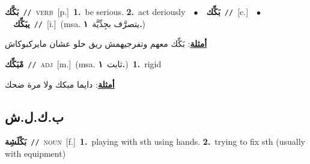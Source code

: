 \documentclass[10pt,a4paper,twoside]{article} %
\begin{document}
\begin{multicols}{2}
{\setlength\topsep{0pt}\textbf{\foreignlanguage{arabic}{بَكَّك}}\ {\color{gray}\texttt{//}\color{black}}\ \textsc{verb}\ [p.]\ \textbf{1.}~be serious.  \textbf{2.}~act deriously\ \ $\bullet$\ \ \setlength\topsep{0pt}\textbf{\foreignlanguage{arabic}{بَكِّك}}\ {\color{gray}\texttt{//}\color{black}}\ [c.]\ \ $\bullet$\ \ \setlength\topsep{0pt}\textbf{\foreignlanguage{arabic}{يبَكِّك}}\ {\color{gray}\texttt{//}\color{black}}\ [i.]\ \color{gray}(msa. \foreignlanguage{arabic}{يتصرَّف بجِدِّيَّة}~\foreignlanguage{arabic}{\textbf{١.}})\color{black}\  \begin{flushright}\color{gray}\foreignlanguage{arabic}{\textbf{\underline{\foreignlanguage{arabic}{أمثلة}}}: بَكِّك معهم وتفرجيهمش ريق حلو عشان مايركبوكاش}\end{flushright}\color{black}} \vspace{2mm}

{\setlength\topsep{0pt}\textbf{\foreignlanguage{arabic}{مْبَكِّك}}\ {\color{gray}\texttt{//}\color{black}}\ \textsc{adj}\ [m.]\ \color{gray}(msa. \foreignlanguage{arabic}{ثابت}~\foreignlanguage{arabic}{\textbf{١.}})\color{black}\ \textbf{1.}~rigid\  \begin{flushright}\color{gray}\foreignlanguage{arabic}{\textbf{\underline{\foreignlanguage{arabic}{أمثلة}}}: دايما مبكك ولا مرة ضحك}\end{flushright}\color{black}} \vspace{2mm}

\vspace{-3mm}
\subsection*{\color{blue}\foreignlanguage{arabic}{ب.ك.ل.ش}\color{blue}{}} 

{\setlength\topsep{0pt}\textbf{\foreignlanguage{arabic}{بَكْلَشِة}}\ {\color{gray}\texttt{//}\color{black}}\ \textsc{noun}\ [f.]\ \textbf{1.}~playing with sth using hands.  \textbf{2.}~trying to fix sth (usually with equipment)\ } \vspace{2mm}


\end{multicols}
\end{document}
